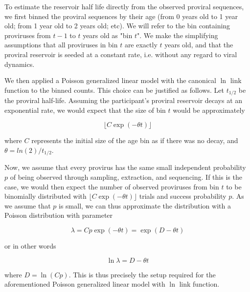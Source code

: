 \documentclass{article}
\begin{document}
To estimate the reservoir half life directly from the observed proviral sequences, we first binned the proviral sequences by their age (from 0 years old to 1 year old; from 1 year old to 2 years old; etc).  We will refer to the bin containing proviruses from $t-1$ to $t$ years old as "bin $t$".  We make the simplifying assumptions that all proviruses in bin $t$ are exactly $t$ years old, and that the proviral reservoir is seeded at a constant rate, i.e. without any regard to viral dynamics.

We then applied a Poisson generalized linear model with the canonical $\ln$ link function to the binned counts.  This choice can be justified as follows.  Let $t_{1/2}$ be the proviral half-life.  Assuming the participant's proviral reservoir decays at an exponential rate, we would expect that the size of bin $t$ would be approximately

\[
\lfloor C \exp(-\theta t) \rfloor
\]

where $C$ represents the initial size of the age bin as if there was no decay, and $\theta = ln(2) / t_{1/2}$.

Now, we assume that every provirus has the same small independent probability $p$ of being observed through sampling, extraction, and sequencing.  If this is the case, we would then expect the number of observed proviruses from bin $t$ to be binomially distributed with $\lfloor C \exp(-\theta t) \rfloor$ trials and success probability $p$.  As we assume that $p$ is small, we can thus approximate the distribution with a Poisson distribution with parameter

\[
\lambda = Cp \exp(-\theta t) = \exp(D - \theta t)
\]

or in other words

\[
\ln \lambda = D - \theta t
\]

where $D = \ln(Cp)$.  This is thus precisely the setup required for the aforementioned Poisson generalized linear model with $\ln$ link function.
\end{document}
